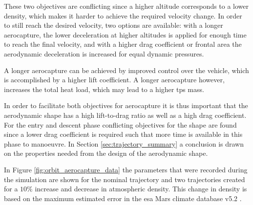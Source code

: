 These two objectives are conflicting since a higher altitude corresponds to a lower density, which makes it harder to achieve the required velocity change. In order to still reach the desired velocity, two options are available: with a longer aerocapture, the lower deceleration at higher altitudes is applied for enough time to reach the final velocity, and with a higher drag coefficient or frontal area the aerodynamic deceleration is increased for equal dynamic pressures.

A longer aerocapture can be achieved by improved control over the vehicle, which is accomplished by a higher lift coefficient. A longer aerocapture however, increases the total heat load, which may lead to a higher \gls{tps} mass.

In order to facilitate both objectives for aerocapture it is thus important that the aerodynamic shape has a high lift-to-drag ratio as well as a high drag coefficient. For the entry and descent phase conflicting objectives for the shape are found since a lower drag coefficient is required such that more time is available in this phase to manoeuvre. In Section \ref{sec:trajectory_summary} a conclusion is drawn on the properties needed from the design of the aerodynamic shape.

In Figure \ref{fig:orbit_aerocapture_data} the parameters that were recorded during the simulation are shown for the nominal trajectory and two trajectories created for a $10\%$ increase and decrease in atmospheric density. This change in density is based on the maximum estimated error in the \gls{esa} Mars climate database v5.2 \cite{Lewis2015}.

